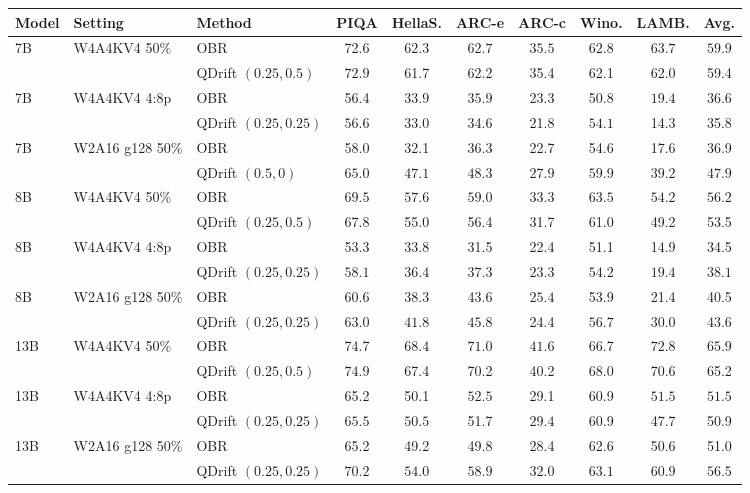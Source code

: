 \begin{tabular}{lllccccccc}
\toprule
Model & Setting & Method & PIQA & HellaS. & ARC-e & ARC-c & Wino. & LAMB. & Avg. \\
\midrule
7B & W4A4KV4 50\% & OBR & 72.6 & $\mathbf{62.3}$ & $\mathbf{62.7}$ & $\mathbf{35.5}$ & $\mathbf{62.8}$ & $\mathbf{63.7}$ & $\mathbf{59.9}$ \\
 &  & QDrift $(0.25, 0.5)$ & $\mathbf{72.9}$ & 61.7 & 62.2 & 35.4 & 62.1 & 62.0 & 59.4 \\
7B & W4A4KV4 4:8p & OBR & 56.4 & $\mathbf{33.9}$ & $\mathbf{35.9}$ & $\mathbf{23.3}$ & 50.8 & $\mathbf{19.4}$ & $\mathbf{36.6}$ \\
 &  & QDrift $(0.25, 0.25)$ & $\mathbf{56.6}$ & 33.0 & 34.6 & 21.8 & $\mathbf{54.1}$ & 14.3 & 35.8 \\
7B & W2A16 g128 50\% & OBR & 58.0 & 32.1 & 36.3 & 22.7 & 54.6 & 17.6 & 36.9 \\
 &  & QDrift $(0.5, 0)$ & $\mathbf{65.0}$ & $\mathbf{47.1}$ & $\mathbf{48.3}$ & $\mathbf{27.9}$ & $\mathbf{59.9}$ & $\mathbf{39.2}$ & $\mathbf{47.9}$ \\
\midrule
8B & W4A4KV4 50\% & OBR & $\mathbf{69.5}$ & $\mathbf{57.6}$ & $\mathbf{59.0}$ & $\mathbf{33.3}$ & $\mathbf{63.5}$ & $\mathbf{54.2}$ & $\mathbf{56.2}$ \\
 &  & QDrift $(0.25, 0.5)$ & 67.8 & 55.0 & 56.4 & 31.7 & 61.0 & 49.2 & 53.5 \\
8B & W4A4KV4 4:8p & OBR & 53.3 & 33.8 & 31.5 & 22.4 & 51.1 & 14.9 & 34.5 \\
 &  & QDrift $(0.25, 0.25)$ & $\mathbf{58.1}$ & $\mathbf{36.4}$ & $\mathbf{37.3}$ & $\mathbf{23.3}$ & $\mathbf{54.2}$ & $\mathbf{19.4}$ & $\mathbf{38.1}$ \\
8B & W2A16 g128 50\% & OBR & 60.6 & 38.3 & 43.6 & $\mathbf{25.4}$ & 53.9 & 21.4 & 40.5 \\
 &  & QDrift $(0.25, 0.25)$ & $\mathbf{63.0}$ & $\mathbf{41.8}$ & $\mathbf{45.8}$ & 24.4 & $\mathbf{56.7}$ & $\mathbf{30.0}$ & $\mathbf{43.6}$ \\
\midrule
13B & W4A4KV4 50\% & OBR & 74.7 & $\mathbf{68.4}$ & $\mathbf{71.0}$ & $\mathbf{41.6}$ & 66.7 & $\mathbf{72.8}$ & $\mathbf{65.9}$ \\
 &  & QDrift $(0.25, 0.5)$ & $\mathbf{74.9}$ & 67.4 & 70.2 & 40.2 & $\mathbf{68.0}$ & 70.6 & 65.2 \\
13B & W4A4KV4 4:8p & OBR & 65.2 & 50.1 & $\mathbf{52.5}$ & 29.1 & 60.9 & $\mathbf{51.5}$ & $\mathbf{51.5}$ \\
 &  & QDrift $(0.25, 0.25)$ & $\mathbf{65.5}$ & $\mathbf{50.5}$ & 51.7 & $\mathbf{29.4}$ & 60.9 & 47.7 & 50.9 \\
13B & W2A16 g128 50\% & OBR & 65.2 & 49.2 & 49.8 & 28.4 & 62.6 & 50.6 & 51.0 \\
 &  & QDrift $(0.25, 0.25)$ & $\mathbf{70.2}$ & $\mathbf{54.0}$ & $\mathbf{58.9}$ & $\mathbf{32.0}$ & $\mathbf{63.1}$ & $\mathbf{60.9}$ & $\mathbf{56.5}$ \\
\bottomrule
\end{tabular}
